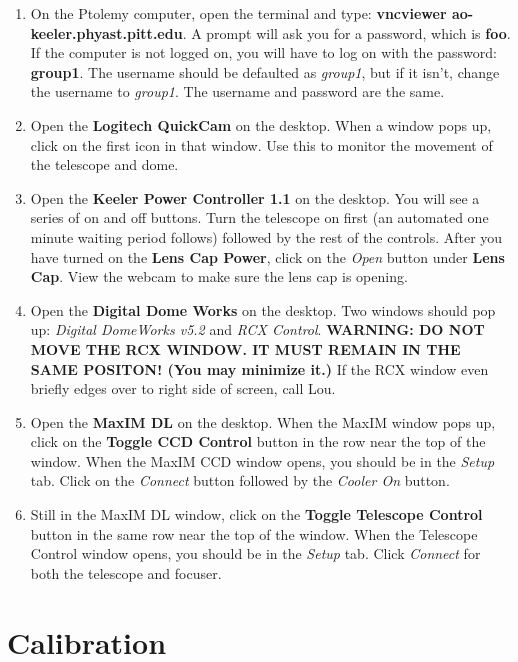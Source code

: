 \documentclass[11pt]{report}
\begin{document}
\begin{enumerate}
\item On the Ptolemy computer, open the terminal and type: {\bf vncviewer ao-keeler.phyast.pitt.edu}. A prompt will ask you for a password, which is {\bf foo}. If the computer is not logged on, you will have to log on with the password: {\bf group1}. The username should be defaulted as \emph{group1}, but if it isn't, change the username to \emph{group1}. The username and password are the same.
\item Open the {\bf Logitech QuickCam} on the desktop. When a window pops up, click on the first icon in that window. Use this to monitor the movement of the telescope and dome.
\item Open the {\bf Keeler Power Controller 1.1} on the desktop. You will see a series of on and off buttons. Turn the telescope on first (an automated one minute waiting period follows) followed by the rest of the controls. After you have turned on the {\bf Lens Cap Power}, click on the \emph{Open} button under {\bf Lens Cap}. View the webcam to make sure the lens cap is opening.
\item Open the {\bf Digital Dome Works} on the desktop. Two windows should pop up: \emph{Digital DomeWorks v5.2} and \emph{RCX Control}. {\bf WARNING: DO NOT MOVE THE RCX WINDOW. IT MUST REMAIN IN THE SAME POSITON! (You may minimize it.)} If the RCX window even briefly edges over to right side of screen, call Lou.
\item Open the {\bf MaxIM DL} on the desktop. When the MaxIM window pops up, click on the {\bf Toggle CCD Control} button in the row near the top of the window. When the MaxIM CCD window opens, you should be in the \emph{Setup} tab. Click on the \emph{Connect} button followed by the \emph{Cooler On} button.
\item Still in the MaxIM DL window, click on the {\bf Toggle Telescope Control} button in the same row near the top of the window. When the Telescope Control window opens, you should be in the \emph{Setup} tab. Click \emph{Connect} for both the telescope and focuser.
\end{enumerate}

\section{Calibration}
\end{document}
